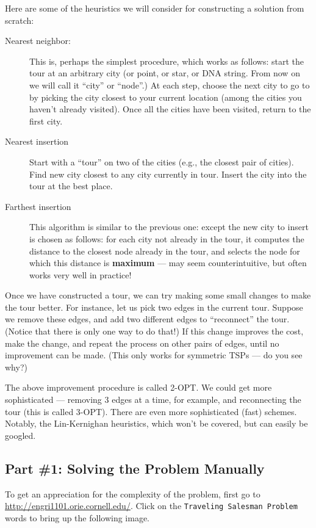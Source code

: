 \documentclass[twoside]{article}%
\begin{document}
Here are some of the heuristics we will consider for constructing a solution from scratch:
\begin{description}
\item[Nearest neighbor:] This is, perhaps the simplest procedure, which works as follows: start the tour at an arbitrary city (or point, or star, or DNA string. From now on we will call it ``city'' or ``node''.) At each step, choose the next city to go to by picking the city closest to your current location (among the cities you haven't already visited). Once all the cities have been visited, return to the first city.
\item[Nearest insertion] Start with a ``tour'' on two of the cities (e.g., the closest pair of cities).  Find new city closest to any city currently in tour. Insert the city into the tour at the best place.
\item[Farthest insertion] This algorithm is similar to the previous one: except the new city to insert is chosen as follows: for each city not already in the tour, it computes the distance to the closest node
already in the tour, and selects the node for which this
distance is \textbf{maximum} --- may seem counterintuitive, but often works very well in practice!
\end{description}
Once we have constructed a tour, we can try making some small changes to make the tour better. For instance, let us pick two edges in the current tour. Suppose we remove these edges, and add two different edges to ``reconnect'' the tour. (Notice that there is only one way to do that!) If this change improves the cost, make the change, and repeat the process on other pairs of edges, until no improvement can be made. (This only works for symmetric TSPs --- do you see why?)

The above improvement procedure is called 2-OPT. We could get more sophisticated --- removing 3 edges at a time, for example, and reconnecting the tour (this is called 3-OPT). There are even more sophisticated (fast) schemes. Notably, the Lin-Kernighan heuristics, which won't be covered, but can easily be googled.


\pagebreak

\subsection*{Part \#1: Solving the Problem Manually}

To get an appreciation for the complexity of the problem, first go to \url{http://engri1101.orie.cornell.edu/}.  Click on the \texttt{Traveling Salesman Problem} words to bring up the following image.
\end{document}

